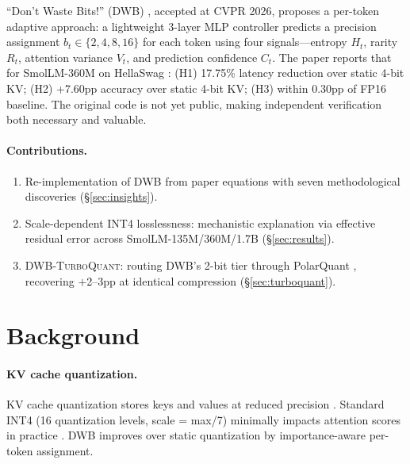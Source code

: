 \documentclass[10pt,twocolumn]{article}
\newcommand{\dwbtq}{\textsc{DWB-TurboQuant}}
\begin{document}
``Don't Waste Bits!'' (DWB) \cite{haeri2026dwb}, accepted at CVPR 2026,
proposes a per-token adaptive approach: a lightweight 3-layer MLP
controller predicts a precision assignment $b_t \in \{2,4,8,16\}$ for
each token using four signals—entropy $H_t$, rarity $R_t$, attention
variance $V_t$, and prediction confidence $C_t$.
The paper reports that for SmolLM-360M \cite{allal2024smollm} on HellaSwag
\cite{zellers2019hellaswag}: (H1) 17.75\% latency reduction over static
4-bit KV; (H2) +7.60pp accuracy over static 4-bit KV; (H3) within
0.30pp of FP16 baseline.
The original code is not yet public, making independent verification both
necessary and valuable.

\paragraph{Contributions.}
\begin{enumerate}[leftmargin=*,topsep=2pt,itemsep=0pt]
  \item Re-implementation of DWB from paper equations with seven
        methodological discoveries (\S\ref{sec:insights}).
  \item Scale-dependent INT4 losslessness: mechanistic explanation
        via effective residual error across SmolLM-135M/360M/1.7B
        (\S\ref{sec:results}).
  \item \dwbtq: routing DWB's 2-bit tier through PolarQuant
        \cite{turboQuant2026}, recovering $+$2--3pp at identical
        compression (\S\ref{sec:turboquant}).
\end{enumerate}

\section{Background}
\label{sec:background}

\paragraph{KV cache quantization.}
KV cache quantization stores keys and values at reduced precision
\cite{liu2024kivi,hooper2024kvquant,yuan2024kvcache}.
Standard INT4 (16 quantization levels, scale = max/7) minimally impacts
attention scores in practice \cite{liu2024kivi}.
DWB \cite{haeri2026dwb} improves over static quantization by
importance-aware per-token assignment.
\end{document}
